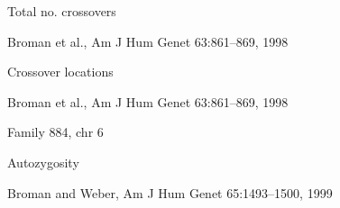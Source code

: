 \documentclass[aspectratio=169,12pt,t]{beamer}
\begin{document}
\begin{frame}{Total no. crossovers}

\vspace{6mm}


\vspace{10mm}


\hfill {\scriptsize \lolit
Broman et al., Am J Hum Genet 63:861--869, 1998}

\note{
}

\end{frame}



\begin{frame}{Crossover locations}

\vspace{2mm}


\vspace{4mm}

\hfill {\scriptsize \lolit
Broman et al., Am J Hum Genet 63:861--869, 1998}

\note{
}

\end{frame}




\begin{frame}[c]{Family 884, chr 6}



\note{
}

\end{frame}



\begin{frame}[c]{}


\note{
}

\end{frame}


\begin{frame}{Autozygosity}

  \vspace{4mm}


\vspace{8mm}

\hfill {\scriptsize \lolit Broman and Weber, Am J Hum Genet 65:1493--1500, 1999}

\note{
}

\end{frame}
\end{document}
